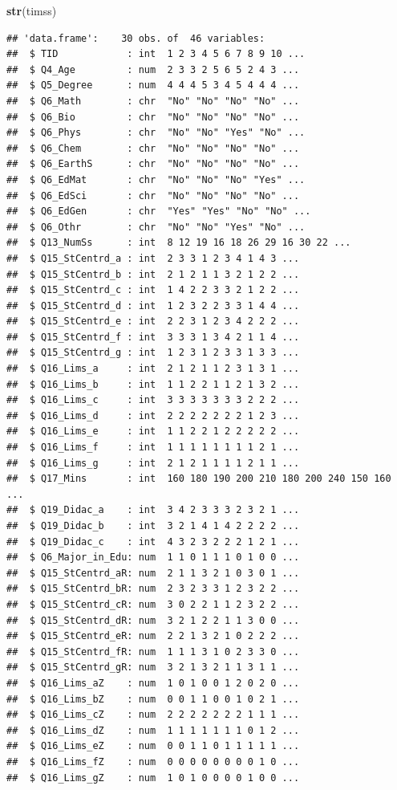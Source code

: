 \documentclass[
]{article}
\newenvironment{Shaded}{\begin{snugshade}}{\end{snugshade}}
\newcommand{\KeywordTok}[1]{\textcolor[rgb]{0.13,0.29,0.53}{\textbf{#1}}}
\newcommand{\NormalTok}[1]{#1}
\begin{document}
\begin{Shaded}
\begin{Highlighting}[]
\KeywordTok{str}\NormalTok{(timss) }
\end{Highlighting}
\end{Shaded}

\begin{verbatim}
## 'data.frame':    30 obs. of  46 variables:
##  $ TID            : int  1 2 3 4 5 6 7 8 9 10 ...
##  $ Q4_Age         : num  2 3 3 2 5 6 5 2 4 3 ...
##  $ Q5_Degree      : num  4 4 4 5 3 4 5 4 4 4 ...
##  $ Q6_Math        : chr  "No" "No" "No" "No" ...
##  $ Q6_Bio         : chr  "No" "No" "No" "No" ...
##  $ Q6_Phys        : chr  "No" "No" "Yes" "No" ...
##  $ Q6_Chem        : chr  "No" "No" "No" "No" ...
##  $ Q6_EarthS      : chr  "No" "No" "No" "No" ...
##  $ Q6_EdMat       : chr  "No" "No" "No" "Yes" ...
##  $ Q6_EdSci       : chr  "No" "No" "No" "No" ...
##  $ Q6_EdGen       : chr  "Yes" "Yes" "No" "No" ...
##  $ Q6_Othr        : chr  "No" "No" "Yes" "No" ...
##  $ Q13_NumSs      : int  8 12 19 16 18 26 29 16 30 22 ...
##  $ Q15_StCentrd_a : int  2 3 3 1 2 3 4 1 4 3 ...
##  $ Q15_StCentrd_b : int  2 1 2 1 1 3 2 1 2 2 ...
##  $ Q15_StCentrd_c : int  1 4 2 2 3 3 2 1 2 2 ...
##  $ Q15_StCentrd_d : int  1 2 3 2 2 3 3 1 4 4 ...
##  $ Q15_StCentrd_e : int  2 2 3 1 2 3 4 2 2 2 ...
##  $ Q15_StCentrd_f : int  3 3 3 1 3 4 2 1 1 4 ...
##  $ Q15_StCentrd_g : int  1 2 3 1 2 3 3 1 3 3 ...
##  $ Q16_Lims_a     : int  2 1 2 1 1 2 3 1 3 1 ...
##  $ Q16_Lims_b     : int  1 1 2 2 1 1 2 1 3 2 ...
##  $ Q16_Lims_c     : int  3 3 3 3 3 3 3 2 2 2 ...
##  $ Q16_Lims_d     : int  2 2 2 2 2 2 2 1 2 3 ...
##  $ Q16_Lims_e     : int  1 1 2 2 1 2 2 2 2 2 ...
##  $ Q16_Lims_f     : int  1 1 1 1 1 1 1 1 2 1 ...
##  $ Q16_Lims_g     : int  2 1 2 1 1 1 1 2 1 1 ...
##  $ Q17_Mins       : int  160 180 190 200 210 180 200 240 150 160 ...
##  $ Q19_Didac_a    : int  3 4 2 3 3 3 2 3 2 1 ...
##  $ Q19_Didac_b    : int  3 2 1 4 1 4 2 2 2 2 ...
##  $ Q19_Didac_c    : int  4 3 2 3 2 2 2 1 2 1 ...
##  $ Q6_Major_in_Edu: num  1 1 0 1 1 1 0 1 0 0 ...
##  $ Q15_StCentrd_aR: num  2 1 1 3 2 1 0 3 0 1 ...
##  $ Q15_StCentrd_bR: num  2 3 2 3 3 1 2 3 2 2 ...
##  $ Q15_StCentrd_cR: num  3 0 2 2 1 1 2 3 2 2 ...
##  $ Q15_StCentrd_dR: num  3 2 1 2 2 1 1 3 0 0 ...
##  $ Q15_StCentrd_eR: num  2 2 1 3 2 1 0 2 2 2 ...
##  $ Q15_StCentrd_fR: num  1 1 1 3 1 0 2 3 3 0 ...
##  $ Q15_StCentrd_gR: num  3 2 1 3 2 1 1 3 1 1 ...
##  $ Q16_Lims_aZ    : num  1 0 1 0 0 1 2 0 2 0 ...
##  $ Q16_Lims_bZ    : num  0 0 1 1 0 0 1 0 2 1 ...
##  $ Q16_Lims_cZ    : num  2 2 2 2 2 2 2 1 1 1 ...
##  $ Q16_Lims_dZ    : num  1 1 1 1 1 1 1 0 1 2 ...
##  $ Q16_Lims_eZ    : num  0 0 1 1 0 1 1 1 1 1 ...
##  $ Q16_Lims_fZ    : num  0 0 0 0 0 0 0 0 1 0 ...
##  $ Q16_Lims_gZ    : num  1 0 1 0 0 0 0 1 0 0 ...
\end{verbatim}
\end{document}

